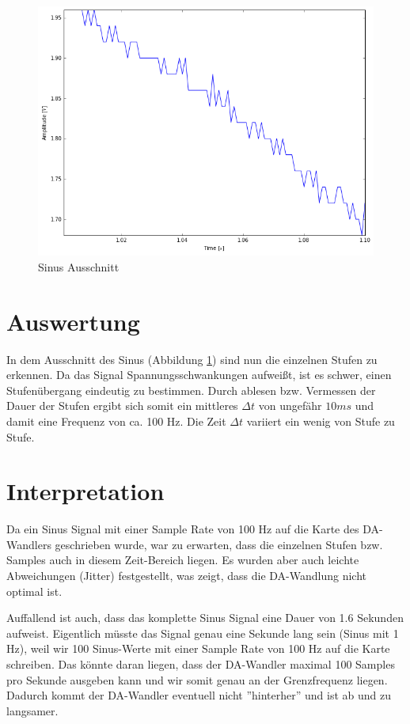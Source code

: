 \documentclass[12pt,oneside,a4paper]{report}
\begin{document}
\begin{figure}[H]
\centering\small
\includegraphics[scale=0.5]{src/Sinus_Ausschnitt.png}
\caption{Sinus Ausschnitt}
\label{fig:SINUS_A}
\end{figure}

\section{Auswertung}
\label{chap:VERSUCH_3_AUSWERTUNG}
In dem Ausschnitt des Sinus (Abbildung \ref{fig:SINUS_A}) sind nun die einzelnen Stufen zu erkennen. Da das Signal Spannungsschwankungen aufweißt, ist es schwer, einen Stufenübergang eindeutig zu bestimmen. Durch ablesen bzw. Vermessen der Dauer der Stufen ergibt sich somit ein mittleres $\Delta t$ von ungefähr $10ms$ und damit eine Frequenz von ca. 100 Hz.
Die Zeit $\Delta t$ variiert ein wenig von Stufe zu Stufe.

\section{Interpretation}
\label{chap:VERSUCH_3_INTERPRETATION}
Da ein Sinus Signal mit einer Sample Rate von 100 Hz auf die Karte des DA-Wandlers geschrieben wurde, war zu erwarten, dass die einzelnen Stufen bzw. Samples auch in diesem Zeit-Bereich liegen.
Es wurden aber auch leichte Abweichungen (Jitter) festgestellt, was zeigt, dass die DA-Wandlung nicht optimal ist.

Auffallend ist auch, dass das komplette Sinus Signal eine Dauer von 1.6 Sekunden aufweist.
Eigentlich müsste das Signal genau eine Sekunde lang sein (Sinus mit 1 Hz), weil wir 100 Sinus-Werte mit einer Sample Rate von 100 Hz auf die Karte schreiben.
Das könnte daran liegen, dass der DA-Wandler maximal 100 Samples pro Sekunde ausgeben kann und wir somit genau an der Grenzfrequenz liegen. Dadurch kommt der DA-Wandler eventuell nicht ''hinterher'' und ist ab und zu langsamer.
\end{document}
